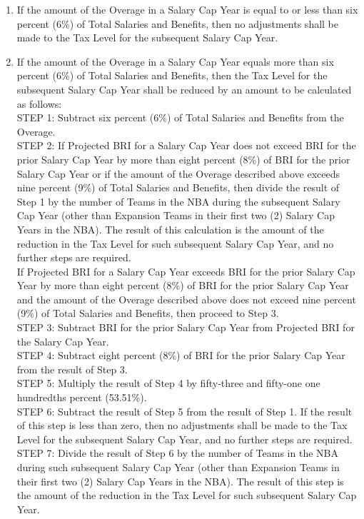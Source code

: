 \documentclass[
]{book}
\providecommand{\tightlist}{%
  \setlength{\itemsep}{0pt}\setlength{\parskip}{0pt}}
\begin{document}
\begin{enumerate}
\begin{enumerate}
\begin{enumerate}
      \begin{enumerate}
      \def\labelenumiv{(\Alph{enumiv})}
      \tightlist
      \item
        If the amount of the Overage in a Salary Cap Year is equal to or less than six percent (6\%) of Total Salaries and Benefits, then no adjustments shall be made to the Tax Level for the subsequent Salary Cap Year.
      \item
        If the amount of the Overage in a Salary Cap Year equals more than six percent (6\%) of Total Salaries and Benefits, then the Tax Level for the subsequent Salary Cap Year shall be reduced by an amount to be calculated as follows:\\
        STEP 1: Subtract six percent (6\%) of Total Salaries and Benefits from the Overage.\\
        STEP 2: If Projected BRI for a Salary Cap Year does not exceed BRI for the prior Salary Cap Year by more than eight percent (8\%) of BRI for the prior Salary Cap Year or if the amount of the Overage described above exceeds nine percent (9\%) of Total Salaries and Benefits, then divide the result of Step 1 by the number of Teams in the NBA during the subsequent Salary Cap Year (other than Expansion Teams in their first two (2) Salary Cap Years in the NBA). The result of this calculation is the amount of the reduction in the Tax Level for such subsequent Salary Cap Year, and no further steps are required.\\
        If Projected BRI for a Salary Cap Year exceeds BRI for the prior Salary Cap Year by more than eight percent (8\%) of BRI for the prior Salary Cap Year and the amount of the Overage described above does not exceed nine percent (9\%) of Total Salaries and Benefits, then proceed to Step 3.\\
        STEP 3: Subtract BRI for the prior Salary Cap Year from Projected BRI for the Salary Cap Year.\\
        STEP 4: Subtract eight percent (8\%) of BRI for the prior Salary Cap Year from the result of Step 3.\\
        STEP 5: Multiply the result of Step 4 by fifty-three and fifty-one one hundredths percent (53.51\%).\\
        STEP 6: Subtract the result of Step 5 from the result of Step 1. If the result of this step is less than zero, then no adjustments shall be made to the Tax Level for the subsequent Salary Cap Year, and no further steps are required.\\
        STEP 7: Divide the result of Step 6 by the number of Teams in the NBA during such subsequent Salary Cap Year (other than Expansion Teams in their first two (2) Salary Cap Years in the NBA). The result of this step is the amount of the reduction in the Tax Level for such subsequent Salary Cap Year.\\

\end{enumerate}
\end{enumerate}
\end{enumerate}
\end{enumerate}
\end{document}
